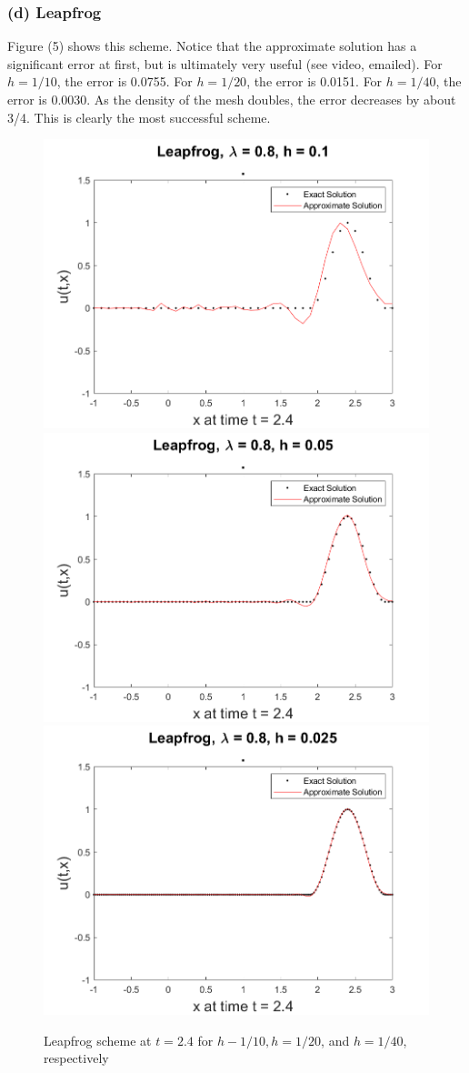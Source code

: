 \documentclass[12pt]{article}
\begin{document}
\subsubsection*{(d) Leapfrog}
\vspace{-1mm}
Figure (5) shows this scheme. Notice that the approximate solution has a significant error at first, but is ultimately very useful (see video, emailed). For $h=1/10$, the error is 0.0755. For $h=1/20$, the error is 0.0151. For $h=1/40$, the error is 0.0030. As the density of the mesh doubles, the error decreases by about 3/4. This is clearly the most successful scheme.

\begin{figure}
	\centering
	\includegraphics[width=.6\linewidth]{./code/d_leapfrog_1_10th.png}	\includegraphics[width=.6\linewidth]{./code/d_leapfrog_1_20th.png}
	\includegraphics[width=.6\linewidth]{./code/d_leapfrog_1_40th.png}
	\caption{Leapfrog scheme at $t=2.4$ for $h-1/10, h=1/20$, and $h=1/40$, respectively}
\end{figure}
\end{document}
